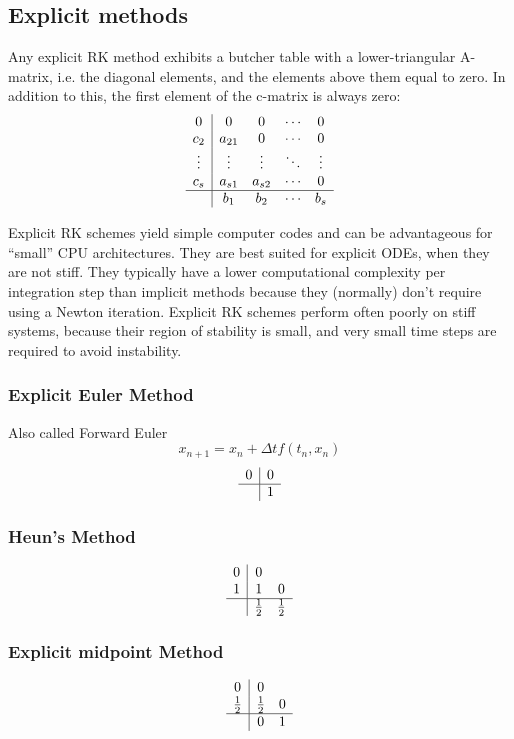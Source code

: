 \subsection{Explicit methods}
Any explicit RK method exhibits a butcher table with a lower-triangular A-matrix, i.e. the diagonal elements, and the elements above them equal to zero. In addition to this, the first element of the c-matrix is always zero: 
$$
\begin{array}{c|cccc}
0 & 0 & 0 & \cdots & 0 \\
c_2 & a_{21} & 0 & \cdots & 0 \\
\vdots & \vdots & \vdots & \ddots & \vdots \\
c_s & a_{s1} & a_{s2} & \cdots & 0 \\
\hline
& b_1 & b_2 & \cdots & b_s \\
\end{array}
$$

Explicit RK schemes yield simple computer codes and can be advantageous for “small” CPU
architectures. They are best suited for explicit ODEs, when they are not stiff. They typically have a lower computational complexity per integration step than implicit methods because they (normally) don’t require using a Newton iteration. Explicit RK schemes perform often poorly on stiff systems, because their region of stability is small, and very small time steps are required
to avoid instability.

\subsubsection{Explicit Euler Method}
Also called Forward Euler
$$
x_{n+1}=x_n+\Delta tf(t_n,x_n)
$$
$$
\begin{array}{c|c}
0 & 0 \\\hline & 1
\end{array}
$$
\subsubsection{Heun's Method}
$$
\begin{array}{c|cc}
0 & 0 \\ 1 & 1 & 0 \\\hline & \frac{1}{2} & \frac{1}{2}
\end{array}
$$
\subsubsection{Explicit midpoint Method}
$$
\begin{array}{c|cc}
0 & 0 \\ \frac{1}{2} & \frac{1}{2} & 0 \\\hline & 0 & 1
\end{array}
$$



